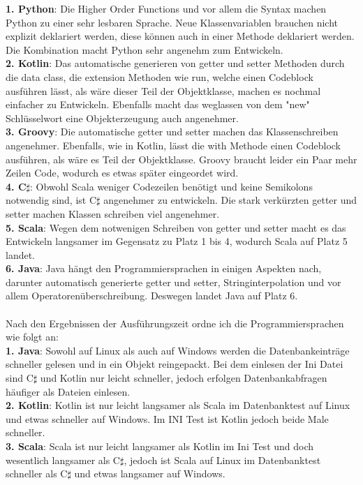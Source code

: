 \documentclass[ngerman]{article}
\begin{document}
    \textbf{1. Python}: Die Higher Order Functions und vor allem die Syntax machen Python zu einer sehr lesbaren Sprache. Neue Klassenvariablen brauchen nicht explizit deklariert werden, diese können auch in einer Methode deklariert werden. Die Kombination macht Python sehr angenehm zum Entwickeln.\\
    \textbf{2. Kotlin}: Das automatische generieren von getter und setter Methoden durch die data class, die extension Methoden wie run, welche einen Codeblock ausführen lässt, als wäre dieser Teil der Objektklasse, machen es nochmal einfacher zu Entwickeln. Ebenfalls macht das weglassen von dem "new" Schlüsselwort eine Objekterzeugung auch angenehmer.\\
    \textbf{3. Groovy}: Die automatische getter und setter machen das Klassenschreiben angenehmer. Ebenfalls, wie in Kotlin, lässt die with Methode einen Codeblock ausführen, als wäre es Teil der Objektklasse. Groovy braucht leider ein Paar mehr Zeilen Code, wodurch es etwas später eingeordet wird.\\
    \textbf{4. C$\sharp$}: Obwohl Scala weniger Codezeilen benötigt und keine Semikolons notwendig sind, ist C$\sharp$ angenehmer zu entwickeln. Die stark verkürzten getter und setter machen Klassen schreiben viel angenehmer.\\
    \textbf{5. Scala}: Wegen dem notwenigen Schreiben von getter und setter macht es das Entwickeln langsamer im Gegensatz zu Platz 1 bis 4, wodurch Scala auf Platz 5 landet.\\
    \textbf{6. Java}: Java hängt den Programmiersprachen in einigen Aspekten nach, darunter automatisch generierte getter und setter, Stringinterpolation und vor allem Operatorenüberschreibung. Deswegen landet Java auf Platz 6.\\\\
    Nach den Ergebnissen der Ausführungszeit ordne ich die Programmiersprachen wie folgt an:\\
    \textbf{1. Java}: Sowohl auf Linux als auch auf Windows werden die Datenbankeinträge schneller gelesen und in ein Objekt reingepackt. Bei dem einlesen der Ini Datei sind C$\sharp$ und Kotlin nur leicht schneller, jedoch erfolgen Datenbankabfragen häufiger als Dateien einlesen.\\
    \textbf{2. Kotlin}: Kotlin ist nur leicht langsamer als Scala im Datenbanktest auf Linux und etwas schneller auf Windows. Im INI Test ist Kotlin jedoch beide Male schneller.\\
    \textbf{3. Scala}: Scala ist nur leicht langsamer als Kotlin im Ini Test und doch wesentlich langsamer als C$\sharp$, jedoch ist Scala auf Linux im Datenbanktest schneller als C$\sharp$ und etwas langsamer auf Windows.\\
\end{document}
